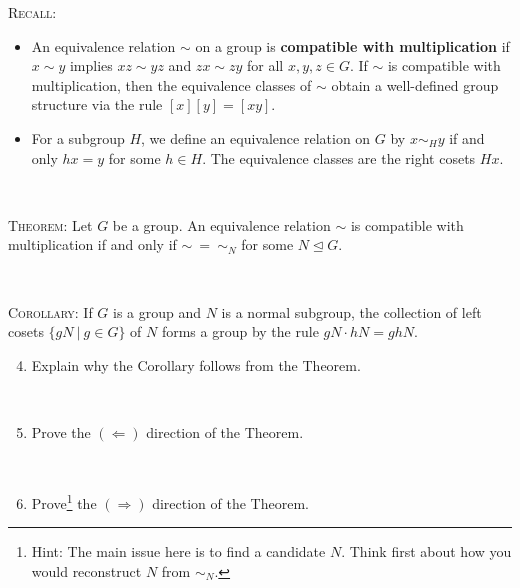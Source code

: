 \documentclass[12pt]{amsart}
\newcommand{\Bold}[1]{\contour{black}{#1}}
\newcommand\itemA{\stepcounter{enumi}\item[{\Bold{(\theenumi)}}]}
\newcommand\itemB{\stepcounter{enumi}\item[(\theenumi)]}
\begin{document}
\smallskip


\begin{framed}
\textsc{Recall:}
\begin{itemize}
\item An equivalence relation $\sim$ on a group is \textbf{compatible with multiplication} if $x \sim y$ implies ${xz \sim yz}$ and ${zx \sim zy}$ for all $x,y,z\in G$. If $\sim$ is compatible with multiplication, then the equivalence classes of $\sim$ obtain a well-defined group structure via the rule $[x][y] = [xy]$.
\item For a subgroup $H$, we define an equivalence relation on $G$ by $x\sim_H y$ if and only $hx = y$ for some $h\in H$. The equivalence classes are the right cosets $Hx$.
\end{itemize}

\


\textsc{Theorem:} Let $G$ be a group. An equivalence relation $\sim$ is compatible with multiplication if and only if ${\sim \ =\ \sim_N}$ for some $N\trianglelefteq G$.

\

\textsc{Corollary:} If $G$ is a group and $N$ is a normal subgroup, the collection of left cosets $\{gN \ | \ g\in G\}$ of $N$ forms a group by the rule $gN \cdot hN = ghN$.
\end{framed}

\smallskip

\begin{enumerate}\setcounter{enumi}{3}
\itemA Explain why the Corollary follows from the Theorem.

\

\itemA Prove the $(\Leftarrow)$ direction of the Theorem.

\

\itemB Prove\footnote{Hint: The main issue here is to find a candidate $N$. Think first about how you would reconstruct $N$ from $\sim_N$.} the $(\Rightarrow)$ direction of the Theorem.
\end{enumerate}
\end{document}
